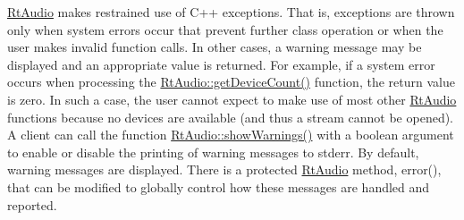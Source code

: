 \hyperlink{class_rt_audio}{Rt\+Audio} makes restrained use of C++ exceptions. That is, exceptions are thrown only when system errors occur that prevent further class operation or when the user makes invalid function calls. In other cases, a warning message may be displayed and an appropriate value is returned. For example, if a system error occurs when processing the \hyperlink{class_rt_audio_a747ce2d73803641bbb66d6e78092aa1a}{Rt\+Audio\+::get\+Device\+Count()} function, the return value is zero. In such a case, the user cannot expect to make use of most other \hyperlink{class_rt_audio}{Rt\+Audio} functions because no devices are available (and thus a stream cannot be opened). A client can call the function \hyperlink{class_rt_audio_af0752ee51cce3dd90a3bd009f9fdbe77}{Rt\+Audio\+::show\+Warnings()} with a boolean argument to enable or disable the printing of warning messages to {\ttfamily stderr}. By default, warning messages are displayed. There is a protected \hyperlink{class_rt_audio}{Rt\+Audio} method, error(), that can be modified to globally control how these messages are handled and reported. 